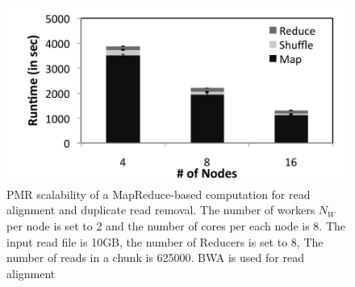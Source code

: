 \documentclass{acm_proc_article-sp}
\begin{document}


\begin{figure}
 \centering
\includegraphics[scale=0.54]{figures/scale-up-bw.pdf} 
\caption{\small PMR scalability of a MapReduce-based computation for
  read alignment and duplicate read removal.  The number of workers $N_{W}$
  per node is set to 2 and the number of cores per each node is 8.  The input read file is 10GB,
  the number of Reducers is set to 8, The number of reads in a chunk
  is 625000. BWA is used for read alignment}

  \label{fig:scale-p-saga-mr} 
\end{figure}
\end{document}
